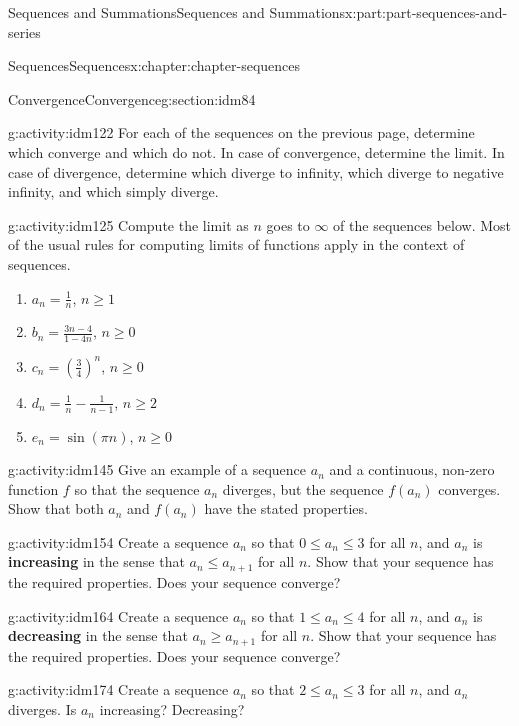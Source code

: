 \documentclass[oneside,10pt,]{book}
\newcommand{\terminology}[1]{\textbf{#1}}
\numberwithin{equation}{section}
\begin{document}
\begin{partptx}{Sequences and Summations}{}{Sequences and Summations}{}{}{x:part:part-sequences-and-series}
\begin{chapterptx}{Sequences}{}{Sequences}{}{}{x:chapter:chapter-sequences}
\begin{sectionptx}{Convergence}{}{Convergence}{}{}{g:section:idm84}
\begin{activity}{}{g:activity:idm122}%
For each of the sequences on the previous page, determine which converge and which do not. In case of convergence, determine the limit. In case of divergence, determine which diverge to infinity, which diverge to negative infinity, and which simply diverge.%
\end{activity}
\begin{activity}{}{g:activity:idm125}%
Compute the limit as \(n\) goes to \(\infty\) of the sequences below. Most of the usual rules for computing limits of functions apply in the context of sequences.%
\begin{enumerate}[font=\bfseries,label=(\alph*),ref=\alph*]
\item{}\(a_n = \frac{1}{n}\), \(n \geq 1\)\item{}\(b_n = \frac{3n-4}{1-4n}\), \(n \geq 0\)\item{}\(c_n = \left(\frac{3}{4}\right)^n\), \(n \geq 0\)\item{}\(d_n = \frac{1}{n} - \frac{1}{n-1}\), \(n \geq 2\)\item{}\(e_n = \sin(\pi n)\), \(n \geq 0\)\end{enumerate}
\end{activity}
\begin{activity}{}{g:activity:idm145}%
Give an example of a sequence \(a_n\) and a continuous, non-zero function \(f\) so that the sequence \(a_n\) diverges, but the sequence \(f(a_n)\) converges. Show that both \(a_n\) and \(f(a_n)\) have the stated properties.%
\end{activity}
\begin{activity}{}{g:activity:idm154}%
Create a sequence \(a_n\) so that \(0 \leq a_n \leq 3\) for all \(n\), and \(a_n\) is \terminology{increasing} in the sense that \(a_n \leq a_{n+1}\) for all \(n\). Show that your sequence has the required properties. Does your sequence converge?%
\end{activity}
\begin{activity}{}{g:activity:idm164}%
Create a sequence \(a_n\) so that \(1 \leq a_n \leq 4\) for all \(n\), and \(a_n\) is \terminology{decreasing} in the sense that \(a_n \geq a_{n+1}\) for all \(n\). Show that your sequence has the required properties. Does your sequence converge?%
\end{activity}
\begin{activity}{}{g:activity:idm174}%
Create a sequence \(a_n\) so that \(2 \leq a_n \leq 3\) for all \(n\), and \(a_n\) diverges. Is \(a_n\) increasing? Decreasing?%

\end{activity}
\end{sectionptx}
\end{chapterptx}
\end{partptx}
\end{document}
